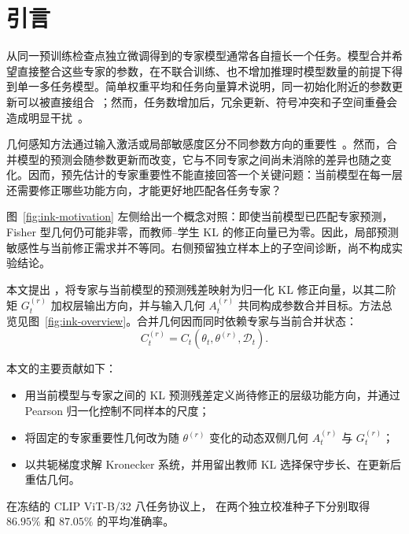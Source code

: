 \section{引言}
\label{sec:ink-introduction}

从同一预训练检查点独立微调得到的专家模型通常各自擅长一个任务。模型合并希望直接整合这些专家的参数，在不联合训练、也不增加推理时模型数量的前提下得到单一多任务模型。简单权重平均和任务向量算术说明，同一初始化附近的参数更新可以被直接组合~\citep{wortsman2022model,ilharco2023editing}；然而，任务数增加后，冗余更新、符号冲突和子空间重叠会造成明显干扰~\citep{yadav2023ties,gargiulo2024task}。

几何感知方法通过输入激活或局部敏感度区分不同参数方向的重要性~\citep{matena2022fisher,jin2023regmean,tam2024mats}。然而，合并模型的预测会随参数更新而改变，它与不同专家之间尚未消除的差异也随之变化。因而，预先估计的专家重要性不能直接回答一个关键问题：当前模型在每一层还需要修正哪些功能方向，才能更好地匹配各任务专家？

图~\ref{fig:ink-motivation} 左侧给出一个概念对照：即使当前模型已匹配专家预测，Fisher 型几何仍可能非零，而教师--学生 KL 的修正向量已为零。因此，局部预测敏感性与当前修正需求并不等同。右侧预留独立样本上的子空间诊断，尚不构成实验结论。

本文提出 \method{}，将专家与当前模型的预测残差映射为归一化 KL 修正向量，以其二阶矩 $G_t^{(r)}$ 加权层输出方向，并与输入几何 $A_t^{(r)}$ 共同构成参数合并目标。方法总览见图~\ref{fig:ink-overview}。合并几何因而同时依赖专家与当前合并状态：
\begin{equation}
  C_t^{(r)}=C_t(\theta_t,\theta^{(r)},\mathcal D_t).
  \label{eq:ink-dynamic-geometry}
\end{equation}

本文的主要贡献如下：
\begin{itemize}[leftmargin=1.6em,itemsep=2pt,topsep=3pt]
  \item 用当前模型与专家之间的 KL 预测残差定义尚待修正的层级功能方向，并通过 Pearson 归一化控制不同样本的尺度；
  \item 将固定的专家重要性几何改为随 $\theta^{(r)}$ 变化的动态双侧几何 $A_t^{(r)}$ 与 $G_t^{(r)}$；
  \item 以共轭梯度求解 Kronecker 系统，并用留出教师 KL 选择保守步长、在更新后重估几何。
\end{itemize}
在冻结的 CLIP ViT-B/32 八任务协议上，\method{} 在两个独立校准种子下分别取得 $86.95\%$ 和 $87.05\%$ 的平均准确率。
